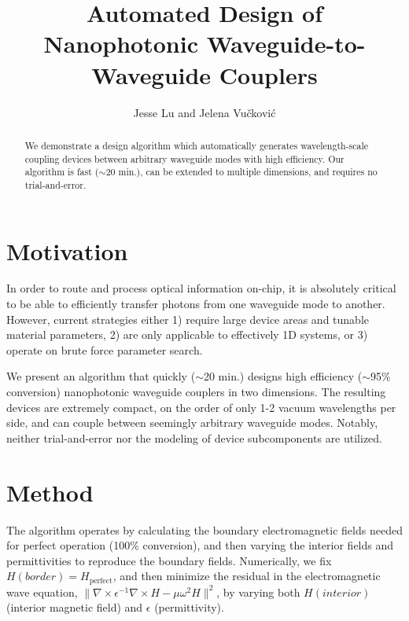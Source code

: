 \documentclass[letterpaper,10pt]{article}
\begin{document}
\title{Automated Design of Nanophotonic Waveguide-to-Waveguide Couplers}
\author{Jesse Lu and Jelena Vu\v{c}kovi\'{c}}
\address{Stanford University, Stanford, California, USA.}

\maketitle
\begin{abstract}
We demonstrate a design algorithm which automatically generates 
wavelength-scale coupling devices between arbitrary waveguide modes with high
efficiency.
Our algorithm is fast ($\sim$20 min.), can be extended to multiple dimensions,
 and requires no trial-and-error.
\end{abstract}

\section{Motivation}
In order to route and process optical information on-chip, it is absolutely
critical to be able to efficiently transfer photons from one waveguide mode
to another.
However, current strategies either 
1) require large device areas and tunable material parameters,
2) are only applicable to effectively 1D systems, or 
3) operate on brute force parameter search.

We present an algorithm that quickly ($\sim$20 min.) designs high efficiency
($\sim$95\% conversion) nanophotonic waveguide couplers in two dimensions.
The resulting devices are extremely compact, on the order of only 1-2 vacuum 
wavelengths per side, and can couple between seemingly arbitrary waveguide 
modes.
Notably, neither trial-and-error nor the modeling of device subcomponents 
are utilized.

\section{Method}
The algorithm operates by calculating the boundary electromagnetic fields
needed for perfect operation (100\% conversion), and then varying the 
interior fields and permittivities to reproduce the boundary fields.  
Numerically, we fix $H({border}) = H_\text{perfect}$,
and then minimize the residual in the electromagnetic wave equation,
$\| \nabla \times \epsilon^{-1} \nabla \times H - \mu \omega^2 H \|^2$, 
by varying both $H({interior})$ (interior magnetic field) and 
$\epsilon$ (permittivity).
\end{document}
